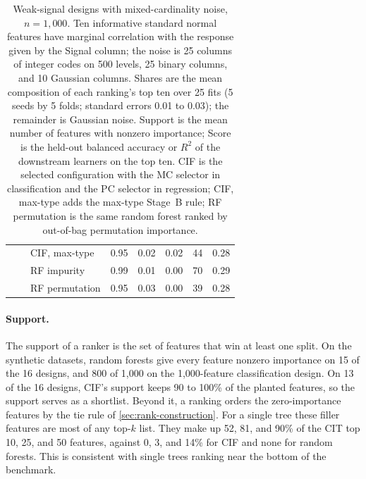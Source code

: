 \begin{table}[!htbp]
\begin{tabular}{@{}lrlrrrrr@{}}
     & & CIF, max-type & 0.95 & 0.02 & 0.02 & 44 & 0.28 \\
     & & RF impurity & 0.99 & 0.01 & 0.00 & 70 & 0.29 \\
     & & RF permutation & 0.95 & 0.03 & 0.00 & 39 & 0.28 \\
        \bottomrule
  \end{tabular}
  \caption{Weak-signal designs with mixed-cardinality noise, $n = 1{,}000$.
  Ten informative standard normal features have marginal correlation with the
  response given by the Signal column; the noise is 25 columns of integer codes
  on 500 levels, 25 binary columns, and 10 Gaussian columns. Shares are the mean
  composition of each ranking's top ten over 25 fits (5 seeds by 5 folds;
  standard errors 0.01 to 0.03); the remainder is Gaussian noise. Support is
  the mean number of features with nonzero importance; Score is the held-out
  balanced accuracy or $R^2$ of the downstream learners on the top ten. CIF is
  the selected configuration with the MC selector in classification and the PC
  selector in regression; CIF, max-type adds the max-type Stage~B rule; RF
  permutation is the same random forest ranked by out-of-bag permutation
  importance.}
  \label{tab:weak-signal-cardinality}
\end{table}

\paragraph{Support.}
The support of a ranker is the set of features that win at least one split.
On the synthetic datasets, random forests give every feature nonzero
importance on 15 of the 16 designs, and 800 of 1,000 on the 1,000-feature
classification design. On 13 of the 16 designs, CIF's support keeps 90 to
100\% of the planted features, so the support serves as a shortlist. Beyond it, a
ranking orders the zero-importance features by the tie rule of
\cref{sec:rank-construction}. For a single tree these filler features are most
of any top-$k$ list. They make up 52, 81, and 90\% of the CIT top 10, 25, and
50 features, against 0, 3, and 14\% for CIF and none for random forests. This is
consistent with single trees ranking near the bottom of the benchmark.

